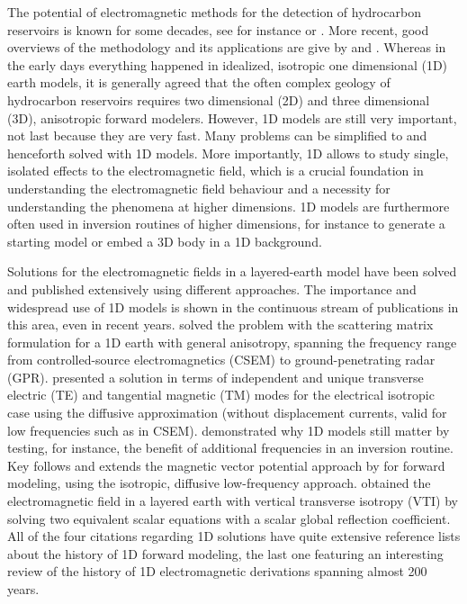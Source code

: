\documentclass[manuscript]{geophysics}
\begin{document}
The potential of electromagnetic methods for the detection of hydrocarbon
reservoirs is known for some decades, see for instance \cite{PIEEE.89.Nekut} or
\cite{B.SEG.91.Chave}. More recent, good overviews of the methodology and its
applications are give by \cite{SG.05.Edwards} and \cite{IEEE.12.Ziolkowksi}.
Whereas in the early days everything happened in idealized, isotropic one
dimensional (1D) earth models, it is generally agreed that the often complex
geology of hydrocarbon reservoirs requires two dimensional (2D) and three
dimensional (3D), anisotropic forward modelers. However, 1D models are still
very important, not last because they are very fast. Many problems can be
simplified to and henceforth solved with 1D models. More importantly, 1D allows
to study single, isolated effects to the electromagnetic field, which is a
crucial foundation in understanding the electromagnetic field behaviour and a
necessity for understanding the phenomena at higher dimensions. 1D models are
furthermore often used in inversion routines of higher dimensions, for instance
to generate a starting model or embed a 3D body in a 1D background.

Solutions for the electromagnetic fields in a layered-earth model have been
solved and published extensively using different approaches. The importance and
wide\-spread use of 1D models is shown in the continuous stream of publications
in this area, even in recent years. \cite{GJI.07.Loseth} solved the problem
with the scattering matrix formulation for a 1D earth with general anisotropy,
spanning the frequency range from controlled-source electromagnetics (CSEM) to
ground-pe\-ne\-tra\-ting radar (GPR).  \cite{GJI.09.Chave} presented a solution
in terms of independent and unique transverse electric (TE) and tangential
magnetic (TM) modes for the electrical isotropic case using the diffusive
approximation (without displacement currents, valid for low frequencies such as
in CSEM). \cite{GEO.09.Key} demonstrated why 1D models still matter by testing,
for instance, the benefit of additional frequencies in an inversion routine.
Key follows and extends the magnetic vector potential approach by
\cite{B.AP.82.Wait} for forward modeling, using the isotropic, diffusive
low-frequency approach.  \cite{GEO.15.Hunziker} obtained the electromagnetic
field in a layered earth with vertical transverse iso\-tro\-py (VTI) by solving
two equivalent scalar equations with a scalar global reflection coefficient.
All of the four citations regarding 1D solutions have quite extensive reference
lists about the history of 1D forward modeling, the last one featuring an
interesting review of the history of 1D electromagnetic derivations spanning
almost 200 years.
\end{document}
